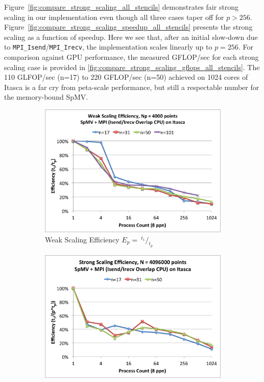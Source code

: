 \documentclass{report}
\begin{document}
Figure~\ref{fig:compare_strong_scaling_all_stencils} demonstrates fair strong scaling in our implementation even though all three cases taper off for $p > 256$. Figure~\ref{fig:compare_strong_scaling_speedup_all_stencils} presents the strong scaling as a function of speedup. Here we see that, after an initial slow-down due to \texttt{MPI\_Isend}/\texttt{MPI\_Irecv}, the implementation scales linearly up to $p=256$. For comparison against GPU performance, the measured GFLOP/sec for each strong scaling case is provided in \ref{fig:compare_strong_scaling_gflops_all_stencils}. The 110 GLFOP/sec (n=17) to 220 GFLOP/sec (n=50) achieved on 1024 cores of Itasca is a far cry from peta-scale performance, but still a respectable number for the memory-bound SpMV. 



\begin{figure}
\centering
\begin{subfigure}{0.48\textwidth}
\centering
\includegraphics[width=\textwidth]{performance_content/scaling/weak_scaling_efficiency_np4000_overlap_cpu_SpMV_and_comm_all_stencils.png}
\caption{Weak Scaling Efficiency $E_p = \ ^{t_1}/_{t_p}$}
\label{fig:compare_weak_scaling_efficiency_all_stencils}
\end{subfigure}
\begin{subfigure}{0.48\textwidth}
\centering
\includegraphics[width=\textwidth]{performance_content/scaling/strong_scaling_efficiency_4M_overlap_cpu_SpMV_and_comm_all_stencils.png}

\end{subfigure}
\end{figure}
\end{document}
